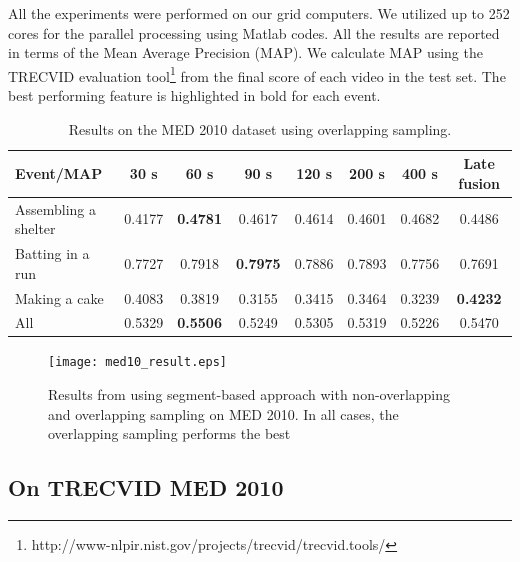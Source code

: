 All the experiments were performed on our grid computers. We utilized up to 252 cores for the parallel processing using Matlab codes. All the results are reported in terms of the Mean Average Precision (MAP). We calculate MAP using the TRECVID evaluation tool\footnote{http://www-nlpir.nist.gov/projects/trecvid/trecvid.tools/} from the final score of each video in the test set. The best performing feature is highlighted in bold for each event. 
\begin{table}
	\renewcommand{\arraystretch}{1.3}
	\caption{Results on the MED 2010 dataset using overlapping sampling.}
	\label{t_med10_overlapping}
	\centering
	\begin{tabular}{|l|cccccc|c|}
		\hline
		Event/MAP & 30 s & 60 s & 90 s & 120 s & 200 s & 400 s & Late fusion \\
		\hline
		Assembling a shelter&0.4177&\textbf{0.4781}&0.4617&0.4614&0.4601&0.4682&0.4486
		\\
		\hline
		Batting in a run&0.7727&0.7918&\textbf{0.7975}&0.7886&0.7893&0.7756&0.7691
		\\
		\hline
		Making a cake&0.4083&0.3819&0.3155&0.3415&0.3464&0.3239&\textbf{0.4232}
		\\
		\hline
		All&0.5329&\textbf{0.5506}&0.5249&0.5305&0.5319&0.5226&0.5470
		\\
		\hline
	\end{tabular}
\end{table}
\begin{figure}
	\centering
	\texttt{[image: med10\_result.eps]}
	\caption{Results from using segment-based approach with non-overlapping and overlapping sampling on MED 2010. In all cases, the overlapping sampling performs the best}
	\label{f_med10_result}
\end{figure}

\subsection{On TRECVID MED 2010}
